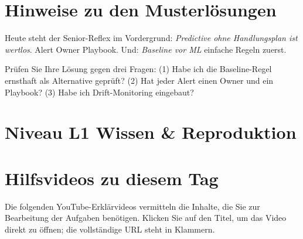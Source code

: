 \documentclass[11pt,a4paper,oneside]{article}
\begin{document}
\section*{Hinweise zu den Musterl\"osungen}
\thispagestyle{plain}

\noindent Heute steht der Senior-Reflex im Vordergrund: \emph{Predictive ohne Handlungsplan ist wertlos}. Alert \textrightarrow{} Owner \textrightarrow{} Playbook. Und: \emph{Baseline vor ML} \textendash{} einfache Regeln zuerst.

\begin{infobox}
Pr\"ufen Sie Ihre L\"osung gegen drei Fragen: (1) Habe ich die Baseline-Regel ernsthaft als Alternative gepr\"uft? (2) Hat jeder Alert einen Owner und ein Playbook? (3) Habe ich Drift-Monitoring eingebaut?
\end{infobox}

\clearpage

\section*{Niveau L1 \textendash{} Wissen \& Reproduktion}

\section*{Hilfsvideos zu diesem Tag}
\thispagestyle{plain}

\noindent Die folgenden YouTube-Erkl\"arvideos vermitteln die Inhalte, die Sie zur Bearbeitung der Aufgaben ben\"otigen. Klicken Sie auf den Titel, um das Video direkt zu \"offnen; die vollst\"andige URL steht in Klammern.
\end{document}
